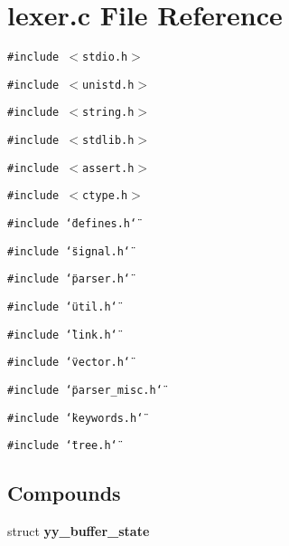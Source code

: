 \section{lexer.c File Reference}
\label{lexer_8c}
{\tt \#include $<$stdio.h$>$}\par
{\tt \#include $<$unistd.h$>$}\par
{\tt \#include $<$string.h$>$}\par
{\tt \#include $<$stdlib.h$>$}\par
{\tt \#include $<$assert.h$>$}\par
{\tt \#include $<$ctype.h$>$}\par
{\tt \#include \char`\"{}defines.h\char`\"{}}\par
{\tt \#include \char`\"{}signal.h\char`\"{}}\par
{\tt \#include \char`\"{}parser.h\char`\"{}}\par
{\tt \#include \char`\"{}util.h\char`\"{}}\par
{\tt \#include \char`\"{}link.h\char`\"{}}\par
{\tt \#include \char`\"{}vector.h\char`\"{}}\par
{\tt \#include \char`\"{}parser\_\-misc.h\char`\"{}}\par
{\tt \#include \char`\"{}keywords.h\char`\"{}}\par
{\tt \#include \char`\"{}tree.h\char`\"{}}\par
\subsection*{Compounds}
\begin{CompactItemize}
\item 
struct {\bf yy\_\-buffer\_\-state}
\end{CompactItemize}
